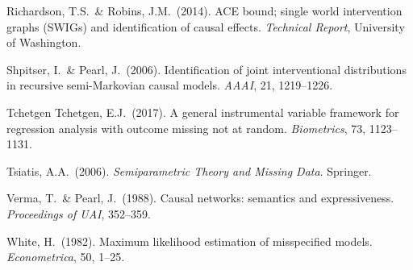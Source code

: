 \documentclass[12pt]{article}
\begin{document}
\begin{description}[leftmargin=1.8em, labelindent=0pt, itemsep=3pt]
  \item Richardson, T.S.\ \& Robins, J.M.\ (2014).
    ACE bound; single world intervention graphs (SWIGs) and
    identification of causal effects.
    \textit{Technical Report}, University of Washington.

  \item Shpitser, I.\ \& Pearl, J.\ (2006).
    Identification of joint interventional distributions in recursive
    semi-Markovian causal models.
    \textit{AAAI}, 21, 1219--1226.

  \item Tchetgen Tchetgen, E.J.\ (2017).
    A general instrumental variable framework for regression analysis
    with outcome missing not at random.
    \textit{Biometrics}, 73, 1123--1131.

  \item Tsiatis, A.A.\ (2006).
    \textit{Semiparametric Theory and Missing Data}. Springer.

  \item Verma, T.\ \& Pearl, J.\ (1988).
    Causal networks: semantics and expressiveness.
    \textit{Proceedings of UAI}, 352--359.

  \item White, H.\ (1982).
    Maximum likelihood estimation of misspecified models.
    \textit{Econometrica}, 50, 1--25.
\end{description}
\endgroup
\end{document}
